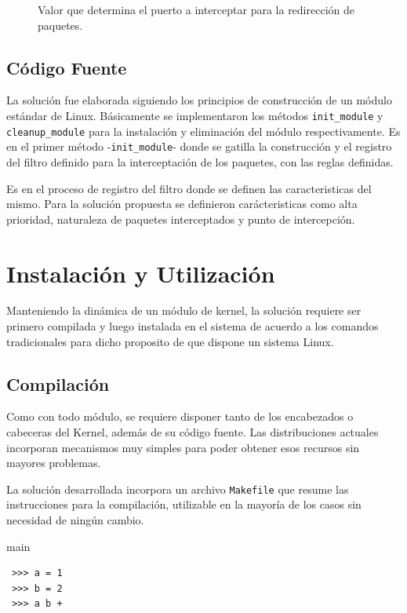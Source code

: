 \begin{description}
\item[] Valor que determina el puerto a interceptar para la redirección de paquetes.
\end{description}




\subsection{Código Fuente}
La solución fue elaborada siguiendo los principios de construcción de un módulo estándar de Linux. Básicamente se implementaron los métodos \verb=init_module= y \verb=cleanup_module= para la instalación y eliminación del módulo respectivamente. Es en el primer método -\verb=init_module=- donde se gatilla la construcción y el registro del filtro definido para la interceptación de los paquetes, con las reglas definidas.

Es en el proceso de registro del filtro donde se definen las caracteristicas del mismo. Para la solución propuesta se definieron carácteristicas como alta prioridad, naturaleza de paquetes interceptados y punto de intercepción.


\section{Instalación y Utilización}
Manteniendo la dinámica de un módulo de kernel, la solución requiere ser primero compilada y luego instalada en el sistema de acuerdo a los comandos tradicionales para dicho proposito de que dispone un sistema Linux.

\subsection{Compilación}
Como con todo módulo, se requiere disponer tanto de los encabezados o cabeceras del Kernel, además de su código fuente. Las distribuciones actuales incorporan mecanismos muy simples para poder obtener esos recursos sin mayores problemas.

La solución desarrollada incorpora un archivo \verb=Makefile= que resume las instrucciones para la compilación, utilizable en la mayoría de los casos sin necesidad de ningún cambio.

\begin{listing}
\caption{main}
\begin{verbatim}
 >>> a = 1 
 >>> b = 2
 >>> a b +
\end{verbatim}
\end{listing}


